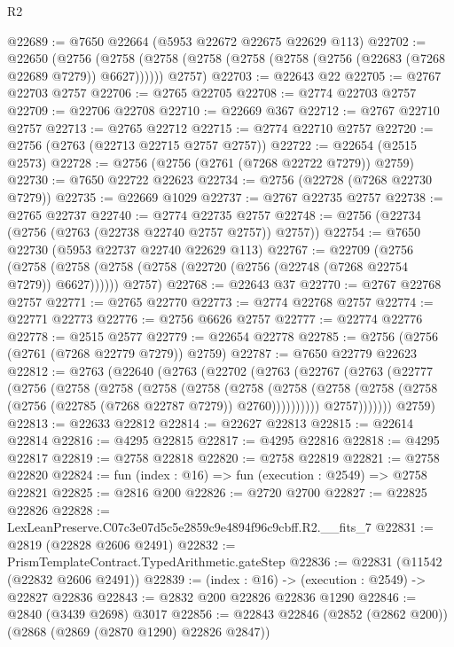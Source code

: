 \begin{lexlean}{R2}
\begin{coremodule}
@22689 := @7650 @22664 (@5953 @22672 @22675 @22629 @113)
@22702 := @22650
    (@2756
      (@2758 (@2758 (@2758 (@2758 (@2758 (@2756 (@22683 (@7268 @22689 @7279)) @6627))))))
      @2757)
@22703 := @22643 @22
@22705 := @2767 @22703 @2757
@22706 := @2765 @22705
@22708 := @2774 @22703 @2757
@22709 := @22706 @22708
@22710 := @22669 @367
@22712 := @2767 @22710 @2757
@22713 := @2765 @22712
@22715 := @2774 @22710 @2757
@22720 := @2756 (@2763 (@22713 @22715 @2757 @2757))
@22722 := @22654 (@2515 @2573)
@22728 := @2756 (@2756 (@2761 (@7268 @22722 @7279)) @2759)
@22730 := @7650 @22722 @22623
@22734 := @2756 (@22728 (@7268 @22730 @7279))
@22735 := @22669 @1029
@22737 := @2767 @22735 @2757
@22738 := @2765 @22737
@22740 := @2774 @22735 @2757
@22748 := @2756 (@22734 (@2756 (@2763 (@22738 @22740 @2757 @2757)) @2757))
@22754 := @7650 @22730 (@5953 @22737 @22740 @22629 @113)
@22767 := @22709
    (@2756
      (@2758 (@2758 (@2758 (@2758 (@22720 (@2756 (@22748 (@7268 @22754 @7279)) @6627))))))
      @2757)
@22768 := @22643 @37
@22770 := @2767 @22768 @2757
@22771 := @2765 @22770
@22773 := @2774 @22768 @2757
@22774 := @22771 @22773
@22776 := @2756 @6626 @2757
@22777 := @22774 @22776
@22778 := @2515 @2577
@22779 := @22654 @22778
@22785 := @2756 (@2756 (@2761 (@7268 @22779 @7279)) @2759)
@22787 := @7650 @22779 @22623
@22812 := @2763
    (@22640
      (@2763
        (@22702
          (@2763
            (@22767
              (@2763
                (@22777
                  (@2756
                    (@2758
                      (@2758
                        (@2758
                          (@2758
                            (@2758
                              (@2758
                                (@2758
                                  (@2758 (@2758 (@2756 (@22785 (@7268 @22787 @7279)) @2760))))))))))
                    @2757)))))))
      @2759)
@22813 := @22633 @22812
@22814 := @22627 @22813
@22815 := @22614 @22814
@22816 := @4295 @22815
@22817 := @4295 @22816
@22818 := @4295 @22817
@22819 := @2758 @22818
@22820 := @2758 @22819
@22821 := @2758 @22820
@22824 := fun (index : @16) => fun (execution : @2549) => @2758 @22821
@22825 := @2816 @200
@22826 := @2720 @2700
@22827 := @22825 @22826
@22828 := LexLeanPreserve.C07c3e07d5c5e2859c9e4894f96c9cbff.R2.__fits_7
@22831 := @2819 (@22828 @2606 @2491)
@22832 := PrismTemplateContract.TypedArithmetic.gateStep
@22836 := @22831 (@11542 (@22832 @2606 @2491))
@22839 := (index : @16) -> (execution : @2549) -> @22827 @22836
@22843 := @2832 @200 @22826 @22836 @1290
@22846 := @2840 (@3439 @2698) @3017
@22856 := @22843 @22846 (@2852 (@2862 @200)) (@2868 (@2869 (@2870 @1290) @22826 @2847))

\end{coremodule}
\end{lexlean}
